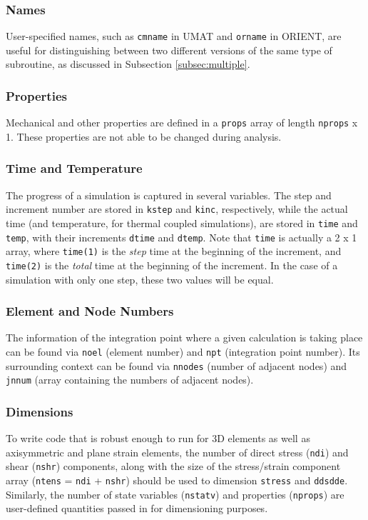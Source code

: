 \documentclass[10pt,letterpaper,oneside]{report}
\begin{document}
\subsubsection{Names}
User-specified names, such as \texttt{cmname} in UMAT and \texttt{orname} in ORIENT, are useful for distinguishing between two different versions of the same type of subroutine, as discussed in Subsection \ref{subsec:multiple}.  

\subsubsection{Properties}
Mechanical and other properties are defined in a \texttt{props} array of length \texttt{nprops} x 1.  These properties are not able to be changed during analysis.

\subsubsection{Time and Temperature}
The progress of a simulation is captured in several variables.  The step and increment number are stored in \texttt{kstep} and \texttt{kinc}, respectively, while the actual time (and temperature, for thermal coupled simulations), are stored in \texttt{time} and \texttt{temp}, with their increments \texttt{dtime} and \texttt{dtemp}.  Note that \texttt{time} is actually a 2 x 1 array, where \texttt{time(1)} is the \emph{step} time at the beginning of the increment, and \texttt{time(2)} is the \emph{total} time at the beginning of the increment.  In the case of a simulation with only one step, these two values will be equal. 

\subsubsection{Element and Node Numbers}
The information of the integration point where a given calculation is taking place can be found via \texttt{noel} (element number) and \texttt{npt} (integration point number).  Its surrounding context can be found via \texttt{nnodes} (number of adjacent nodes) and \texttt{jnnum} (array containing the numbers of adjacent nodes). 

\subsubsection{Dimensions}
To write code that is robust enough to run for 3D elements as well as axisymmetric and plane strain elements, the number of direct stress (\texttt{ndi}) and shear (\texttt{nshr}) components, along with the size of the stress/strain component array (\texttt{ntens} = \texttt{ndi} + \texttt{nshr}) should be used to dimension \texttt{stress} and \texttt{ddsdde}.  Similarly, the number of state variables (\texttt{nstatv}) and properties (\texttt{nprops}) are user-defined quantities passed in for dimensioning purposes.  
\end{document}
